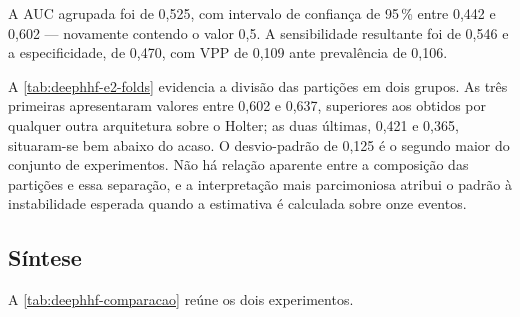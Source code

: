 \begin{table}[h!]
	\captionsetup{width=11cm}
\end{table}

A \gls{AUC} agrupada foi de 0,525, com intervalo de confiança de 95\,\%
entre 0,442 e 0,602 --- novamente contendo o valor 0,5. A sensibilidade
resultante foi de 0,546 e a especificidade, de 0,470, com \gls{VPP} de
0,109 ante prevalência de 0,106.

A \autoref{tab:deephhf-e2-folds} evidencia a divisão das partições em dois
grupos. As três primeiras apresentaram valores entre 0,602 e 0,637,
superiores aos obtidos por qualquer outra arquitetura sobre o Holter; as
duas últimas, 0,421 e 0,365, situaram-se bem abaixo do acaso. O
desvio-padrão de 0,125 é o segundo maior do conjunto de experimentos. Não há
relação aparente entre a composição das partições e essa separação, e a
interpretação mais parcimoniosa atribui o padrão à instabilidade esperada
quando a estimativa é calculada sobre onze eventos.

\subsection{Síntese}
\label{subsec:deephhf-sintese}

A \autoref{tab:deephhf-comparacao} reúne os dois experimentos.

